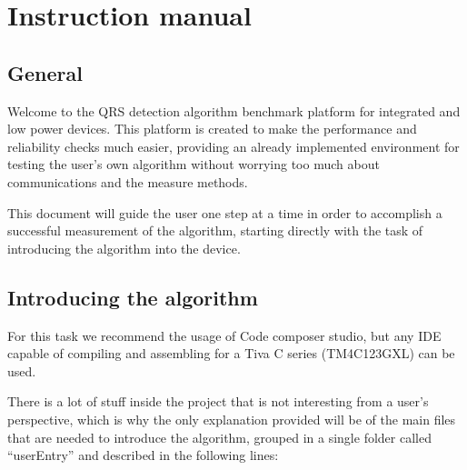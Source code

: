 
\pagestyle{fancy}
\fancyhead[LE,RO]{\thepage}
\fancyhead[LO]{\nouppercase{\rightmark}}

\chapter{Instruction manual}

\minitoc

\section{General}

Welcome to the QRS detection algorithm benchmark platform for integrated and low power devices. This platform is created to make the performance and reliability checks much easier, providing an already implemented environment for testing the user's own algorithm without worrying too much about communications and the measure methods.

This document will guide the user one step at a time in order to accomplish a successful measurement of the algorithm, starting directly with the task of introducing the algorithm into the device.

\section{Introducing the algorithm}
For this task we recommend the usage of Code composer studio, but any IDE capable of compiling and assembling for a Tiva C series (TM4C123GXL) can be used.

There is a lot of stuff inside the project that is not interesting from a user's perspective, which is why the only explanation provided will be of the main files that are needed to introduce the algorithm, grouped in a single folder called “userEntry” and described in the following lines:

